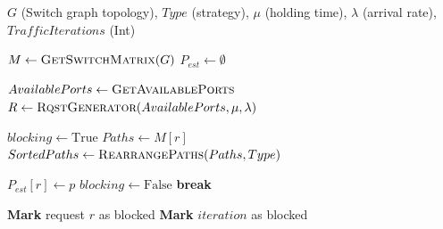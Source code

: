\begin{algorithm}[h]
    \caption{Dynamic experiment of blocking rate}
    \label{alg:dynamic_experiment}
    \begin{algorithmic}[1]
        \Require $G$ (Switch graph topology), $Type$ (strategy), $\mu$ (holding time), $\lambda$ (arrival rate), $TrafficIterations$ (Int)

        \State $M \gets \Call{GetSwitchMatrix}{G}$
        \State $P_{est} \gets \emptyset$

        \State $AvailablePorts \gets \Call{GetAvailablePorts}{}$
        \State $R \gets \Call{RqstGenerator}{AvailablePorts, \mu, \lambda}$

        \State $blocking \gets \text{True}$
        \State $Paths \gets M[r]$
        \State $SortedPaths \gets \Call{RearrangePaths}{Paths, Type}$

        \State $P_{est}[r] \gets p$
        \State $blocking \gets \text{False}$
        \State \textbf{break}
        \EndIf
        \EndFor

        \State \textbf{Mark} request $r$ as blocked
        \State \textbf{Mark} $iteration$ as blocked
        \EndIf
        \EndFor

        \State {} 
        \EndFor
    \end{algorithmic}
\end{algorithm}

